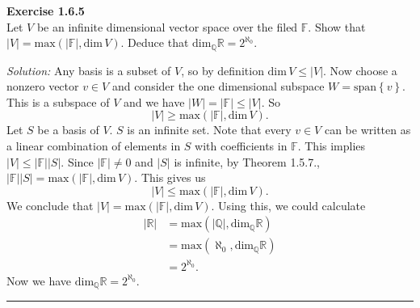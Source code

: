 \documentclass[a4paper, 11pt]{article}
\newenvironment{problem}[2][Exercise]
    { \begin{mdframed}[backgroundcolor=gray!20] \textbf{#1 #2} \\}
    {  \end{mdframed}}
\newenvironment{solution}
    {\textit{Solution:}}
    {}
\begin{document}

\begin{problem}{1.6.5}
Let \(V\) be an infinite dimensional vector space over the filed \(\mathbb{F}\). Show that \(|V|=\text{max}(|\mathbb{F}|,\text{dim}\, V)\). Deduce that \(\text{dim}_\mathbb{Q}\mathbb{R}=2^{\aleph_0}\).
\end{problem}
\begin{solution}
Any basis is a subset of \(V\), so by definition \(\text{dim}\, V\leq |V|\). Now choose a nonzero vector \(v\in V\) and consider the one dimensional subspace \(W=\text{span}\left\{v\right\}\). This is a subspace of \(V\) and we have \(|W|=|\mathbb{F}|\leq |V|\). So 
$$|V|\geq \text{max}(|\mathbb{F}|,\text{dim}\, V).$$  
Let \(S\) be a basis of \(V\). \(S\) is an infinite set. Note that every \(v\in V\) can be written as a linear combination of elements in \(S\) with coefficients in \(\mathbb{F}\). This implies \(|V|\leq |\mathbb{F}||S|\). Since \(|\mathbb{F}|\neq 0\) and \(|S|\) is infinite, by Theorem 1.5.7., \(|\mathbb{F}||S|=\text{max}(|\mathbb{F}|,\text{dim}\, V)\). This gives us 
$$|V|\leq \text{max}(|\mathbb{F}|,\text{dim}\, V).$$
We conclude that \(|V|= \text{max}(|\mathbb{F}|,\text{dim}\, V)\). Using this, we could calculate 
$$\begin{align*}
    |\mathbb{R}| & = \text{max}(|\mathbb{Q}|, \text{dim}_\mathbb{Q}\mathbb{R} )\\ 
                 & = \text{max}(\aleph_0, \text{dim}_\mathbb{Q}\mathbb{R}) \\
                 & = 2^{\aleph_0}.
\end{align*}$$
Now we have \(\text{dim}_\mathbb{Q}\mathbb{R}=2^{\aleph_0}\).
\\
\end{solution}
\noindent\rule{7in}{2.8pt}
\end{document}
